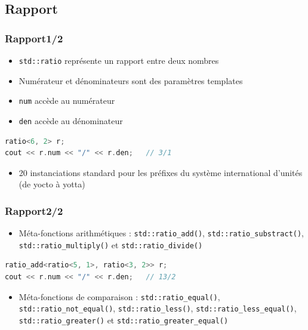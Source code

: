 \documentclass[C++.tex]{subfiles}
\begin{document}
\subsection*{Rapport}
\begin{frame}[fragile]
	\frametitle{Rapport\titlehfill{}1/2}


	\begin{itemize}
		\item \lstinline|std::ratio| représente un rapport entre deux nombres
		\item Numérateur et dénominateurs sont des paramètres templates
		\item \lstinline|num| accède au numérateur
		\item \lstinline|den| accède au dénominateur
	\end{itemize}

	\begin{lstlisting}[language=C++]
ratio<6, 2> r;
cout << r.num << "/" << r.den;   // 3/1\end{lstlisting}

	\begin{itemize}
		\item 20 instanciations standard pour les préfixes du système international d'unités (de yocto à yotta)

	\end{itemize}
\end{frame}

\begin{frame}[fragile]
	\frametitle{Rapport\titlehfill{}2/2}
	\begin{itemize}
		\item Méta-fonctions arithmétiques : \lstinline|std::ratio_add()|, \lstinline|std::ratio_substract()|, \lstinline|std::ratio_multiply()| et \lstinline|std::ratio_divide()|

	\end{itemize}

	\begin{lstlisting}[language=C++]
ratio_add<ratio<5, 1>, ratio<3, 2>> r;
cout << r.num << "/" << r.den;   // 13/2\end{lstlisting}

	\begin{itemize}
		\item Méta-fonctions de comparaison : \lstinline|std::ratio_equal()|, \lstinline|std::ratio_not_equal()|, \lstinline|std::ratio_less()|, \lstinline|std::ratio_less_equal()|, \lstinline|std::ratio_greater()| et \lstinline|std::ratio_greater_equal()|
	\end{itemize}
\end{frame}
\end{document}
